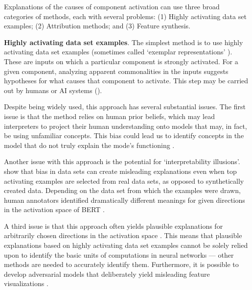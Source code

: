 \label{par:activation-causes}

Explanations of the causes of component activation can use three broad categories of methods, each with several problems: (1) Highly activating data set examples; (2) Attribution methods; and (3) Feature synthesis.

\textbf{Highly activating data set examples}. The simplest method is to use highly activating data set examples (sometimes called `exemplar representations' \citep{hernandez2022natural}). These are inputs on which a particular component is strongly activated. For a given component, analyzing apparent commonalities in the inputs suggests hypotheses for what causes that component to activate. This step may be carried out by humans or AI systems ().

Despite being widely used, this approach has several substantial issues. The first issue is that the method relies on human prior beliefs, which may lead interpreters to project their human understanding onto models that may, in fact, be using unfamiliar concepts. This bias could lead us to identify concepts in the model that do not truly explain the mode's functioning \citep{Freiesleben_2023_weneedtotalk, Donnelly_2019_sentimentneuron, GALE_2020_ObjectDetectors}.

Another issue with this approach is the potential for `interpretability illusions'. \citet{bolukbasi2021interpretabilityillusionbert} show that bias in data sets can create misleading explanations even when top activating examples are selected from real data sets, as opposed to synthetically created data. Depending on the data set from which the examples were drawn, human annotators identified dramatically different meanings for given directions in the activation space of BERT \citep{devlin2019bertpretrainingdeepbidirectional}.

A third issue is that this approach often yields plausible explanations for arbitrarily chosen directions in the activation space \citep{szegedy2014intriguingpropertiesneuralnetworks}. This means that plausible explanations based on highly activating data set examples cannot be solely relied upon to identify the basic units of computations in neural networks — other methods are needed to accurately identify them. Furthermore, it is possible to develop adversarial models that deliberately yield misleading feature visualizations \citep{geirhos2024donttrusteyesunreliability}.


